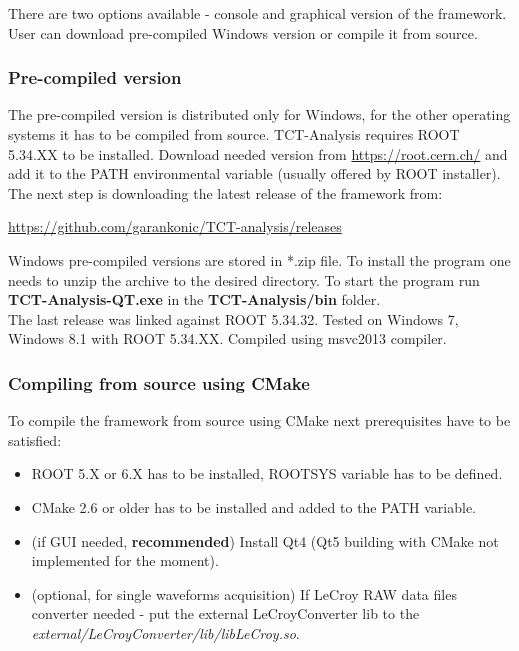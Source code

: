 \documentclass[12pt,oneside,notitlepage,abstracton,a4paper]{scrartcl}
\begin{document}
There are two options available - console and graphical version of the framework. User can download pre-compiled Windows version or compile it from source.

\subsubsection{Pre-compiled version}

The pre-compiled version is distributed only for Windows, for the other operating systems it has to be compiled from source. TCT-Analysis requires ROOT 5.34.XX to be installed. Download needed version from \url{https://root.cern.ch/} and add it to the PATH environmental variable (usually offered by ROOT installer).
\\ \indent The next step is downloading the latest release of the framework from:
\begin{displayquote}
\url{https://github.com/garankonic/TCT-analysis/releases}
\end{displayquote}
Windows pre-compiled versions are stored in *.zip file. To install the program one needs to unzip the archive to the desired directory.
To start the program run \textbf{TCT-Analysis-QT.exe} in the \textbf{TCT-Analysis/bin} folder.
\\ \indent The last release was linked against ROOT 5.34.32. Tested on Windows 7, Windows 8.1 with ROOT 5.34.XX. Compiled using msvc2013 compiler.

\subsubsection{Compiling from source using CMake}

To compile the framework from source using CMake next prerequisites have to be satisfied:
\begin{itemize}
\item ROOT 5.X or 6.X has to be installed, ROOTSYS variable has to be defined.
\item CMake 2.6 or older has to be installed and added to the PATH variable.
\item (if GUI needed, \textbf{recommended}) Install Qt4 (Qt5 building with CMake not implemented for the moment).
\item (optional, for single waveforms acquisition) If LeCroy RAW data files converter needed - put the external LeCroyConverter lib to the \textit{external/LeCroyConverter/lib/libLeCroy.so}.
\end{itemize}
\end{document}
